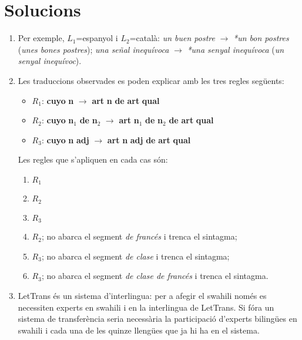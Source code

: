 \section{Solucions}
\begin{enumerate}
  \item Per exemple, $L_1$=espanyol i $L_2$=català: \emph{un buen
      postre} $\rightarrow$ \emph{*un bon postres} (\emph{unes bones
      postres}); \emph{una señal inequívoca} $\rightarrow$ \emph{*una
        senyal inequívoca} (\emph{un senyal inequívoc}).


\item Les traduccions observades es poden explicar amb les tres regles
  següents:
\begin{itemize}
\item $R_1$: {\bf cuyo} {\bf n} $\rightarrow$ {\bf art} {\bf n} {\bf de}
{\bf art} {\bf qual}
\item $R_2$: {\bf cuyo} {\bf n}$_1$ {\bf de} {\bf n}$_2$ 
$\rightarrow$ {\bf art} {\bf n}$_1$ {\bf de} {\bf n}$_2$ {\bf de} 
{\bf art} {\bf qual}
\item $R_3$: {\bf cuyo} {\bf n} {\bf adj} $\rightarrow$ {\bf art} {\bf n} {\bf adj}  {\bf de}
{\bf art} {\bf qual}
\end{itemize}
Les regles que s'apliquen en cada cas són:
\begin{enumerate}
\item $R_1$
\item $R_2$
\item $R_3$
\item $R_2$; no abarca el segment  \emph{de francés} i trenca el
  sintagma; 
\item $R_3$; no abarca el segment  \emph{de clase} i trenca el
  sintagma;
\item $R_3$; no abarca el segment \emph{de clase de francés} i trenca
  el sintagma.
\end{enumerate}


\item LetTrans és un sistema d'interlingua: per a afegir el swahili
  només es necessiten experts en swahili i en la interlingua de
  LetTrans. Si fóra un sistema de transferència seria necessària la
  participació d'experts bilingües en swahili i cada una de les quinze
  llengües que ja hi ha en el sistema.


\end{enumerate}
